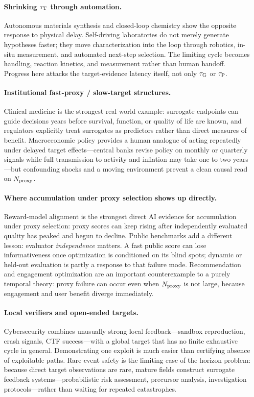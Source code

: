 \paragraph{Shrinking $\tau_{\mathrm{T}}$ through automation.}
Autonomous materials synthesis and closed-loop chemistry show the opposite response to physical delay. Self-driving laboratories do not merely generate hypotheses faster; they move characterization into the loop through robotics, in-situ measurement, and automated next-step selection. The limiting cycle becomes handling, reaction kinetics, and measurement rather than human handoff. Progress here attacks the target-evidence latency itself, not only $\tau_{\mathrm{G}}$ or $\tau_{\mathrm{P}}$.

\paragraph{Institutional fast-proxy / slow-target structures.}
Clinical medicine is the strongest real-world example: surrogate endpoints can guide decisions years before survival, function, or quality of life are known, and regulators explicitly treat surrogates as predictors rather than direct measures of benefit. Macroeconomic policy provides a human analogue of acting repeatedly under delayed target effects---central banks revise policy on monthly or quarterly signals while full transmission to activity and inflation may take one to two years---but confounding shocks and a moving environment prevent a clean causal read on $N_{\mathrm{proxy}}$.

\paragraph{Where accumulation under proxy selection shows up directly.}
Reward-model alignment is the strongest direct AI evidence for accumulation under proxy selection: proxy scores can keep rising after independently evaluated quality has peaked and begun to decline. Public benchmarks add a different lesson: evaluator \emph{independence} matters. A fast public score can lose informativeness once optimization is conditioned on its blind spots; dynamic or held-out evaluation is partly a response to that failure mode. Recommendation and engagement optimization are an important counterexample to a purely temporal theory: proxy failure can occur even when $N_{\mathrm{proxy}}$ is not large, because engagement and user benefit diverge immediately.

\paragraph{Local verifiers and open-ended targets.}
Cybersecurity combines unusually strong local feedback---sandbox reproduction, crash signals, CTF success---with a global target that has no finite exhaustive cycle in general. Demonstrating one exploit is much easier than certifying absence of exploitable paths. Rare-event safety is the limiting case of the horizon problem: because direct target observations are rare, mature fields construct surrogate feedback systems---probabilistic risk assessment, precursor analysis, investigation protocols---rather than waiting for repeated catastrophes.


